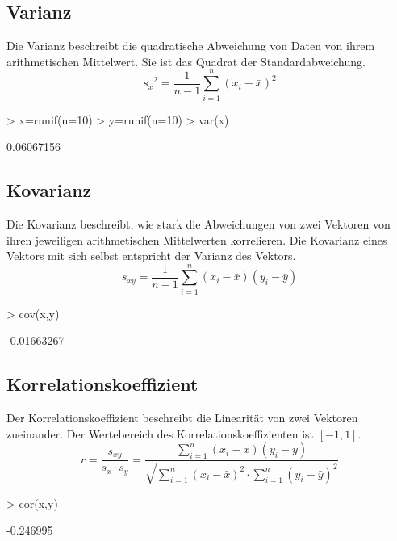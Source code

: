 \subsection{Varianz}
Die Varianz beschreibt die quadratische Abweichung von Daten von ihrem 
arithmetischen Mittelwert. Sie ist das Quadrat der Standardabweichung. 
\[ {s_x}^2 = \frac{1}{n-1} \sum\limits_{i=1}^{n} (x_i - \bar{x})^2 \]
\begin{Schunk}
\begin{Sinput}
> x=runif(n=10)
> y=runif(n=10)
> var(x)
\end{Sinput}
\begin{Soutput}
[1] 0.06067156
\end{Soutput}
\end{Schunk}

\subsection{Kovarianz}
Die Kovarianz beschreibt, wie stark die Abweichungen von zwei Vektoren von 
ihren jeweiligen arithmetischen Mittelwerten korrelieren. Die Kovarianz 
eines Vektors mit sich selbst entspricht der Varianz des Vektors. 
\[ s_{xy} 
= \frac{1}{n-1} \sum\limits_{i=1}^{n} (x_i - \bar{x}) (y_i - \bar{y}) \]
\begin{Schunk}
\begin{Sinput}
> cov(x,y)
\end{Sinput}
\begin{Soutput}
[1] -0.01663267
\end{Soutput}
\end{Schunk}

\subsection{Korrelationskoeffizient}
Der Korrelationskoeffizient beschreibt die Linearität von zwei Vektoren 
zueinander. Der Wertebereich des Korrelationskoeffizienten ist $[-1, 1]$. 
\[ r = \frac{s_{xy}}{s_x \cdot s_y} 
= \frac{\sum\limits_{i=1}^{n} (x_i - \bar{x}) (y_i - \bar{y})}
{\sqrt{\sum\limits_{i=1}^{n} (x_i - \bar{x})^2  \cdot 
\sum\limits_{i=1}^{n} (y_i - \bar{y})^2 }} \]
\begin{Schunk}
\begin{Sinput}
> cor(x,y)
\end{Sinput}
\begin{Soutput}
[1] -0.246995
\end{Soutput}
\end{Schunk}

